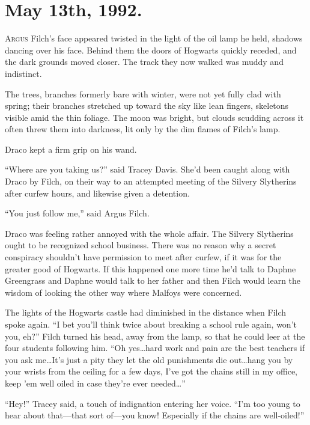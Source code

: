 
\section{May 13th, 1992.}

\lettrine{A}{rgus} Filch’s face appeared twisted in the light of the oil lamp he held, shadows dancing over his face. Behind them the doors of Hogwarts quickly receded, and the dark grounds moved closer. The track they now walked was muddy and indistinct.

The trees, branches formerly bare with winter, were not yet fully clad with spring; their branches stretched up toward the sky like lean fingers, skeletons visible amid the thin foliage. The moon was bright, but clouds scudding across it often threw them into darkness, lit only by the dim flames of Filch’s lamp.

Draco kept a firm grip on his wand.

“Where are you taking us?” said Tracey Davis. She’d been caught along with Draco by Filch, on their way to an attempted meeting of the Silvery Slytherins after curfew hours, and likewise given a detention.

“You just follow me,” said Argus Filch.

Draco was feeling rather annoyed with the whole affair. The Silvery Slytherins ought to be recognized school business. There was no reason why a secret conspiracy shouldn’t have permission to meet after curfew, if it was for the greater good of Hogwarts. If this happened one more time he’d talk to Daphne Greengrass and Daphne would talk to her father and then Filch would learn the wisdom of looking the other way where Malfoys were concerned.

The lights of the Hogwarts castle had diminished in the distance when Filch spoke again. “I bet you’ll think twice about breaking a school rule again, won’t you, eh?” Filch turned his head, away from the lamp, so that he could leer at the four students following him. “Oh yes…hard work and pain are the best teachers if you ask me…It’s just a pity they let the old punishments die out…hang you by your wrists from the ceiling for a few days, I’ve got the chains still in my office, keep ’em well oiled in case they’re ever needed…”

“Hey!” Tracey said, a touch of indignation entering her voice. “I’m too young to hear about that—that sort of—you know! Especially if the chains are well-oiled!”

